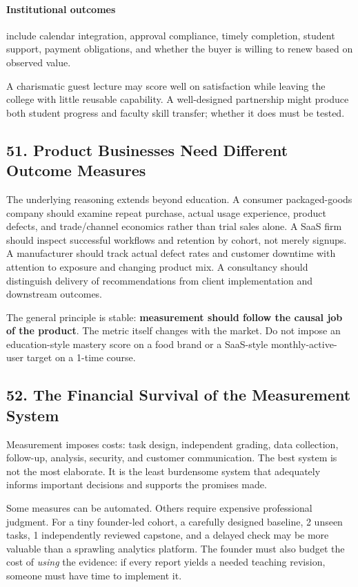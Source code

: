 \paragraph*{Institutional outcomes} include calendar integration, approval compliance, timely completion, student support, payment obligations, and whether the buyer is willing to renew based on observed value.

A charismatic guest lecture may score well on satisfaction while leaving the college with little reusable capability. A well-designed partnership might produce both student progress and faculty skill transfer; whether it does must be tested.

\subsection*{51. Product Businesses Need Different Outcome Measures}

The underlying reasoning extends beyond education. A consumer packaged-goods company should examine repeat purchase, actual usage experience, product defects, and trade/channel economics rather than trial sales alone. A SaaS firm should inspect successful workflows and retention by cohort, not merely signups. A manufacturer should track actual defect rates and customer downtime with attention to exposure and changing product mix. A consultancy should distinguish delivery of recommendations from client implementation and downstream outcomes.

The general principle is stable: \textbf{measurement should follow the causal job of the product}. The metric itself changes with the market. Do not impose an education-style mastery score on a food brand or a SaaS-style monthly-active-user target on a 1-time course.

\subsection*{52. The Financial Survival of the Measurement System}

Measurement imposes costs: task design, independent grading, data collection, follow-up, analysis, security, and customer communication. The best system is not the most elaborate. It is the least burdensome system that adequately informs important decisions and supports the promises made.

Some measures can be automated. Others require expensive professional judgment. For a tiny founder-led cohort, a carefully designed baseline, 2 unseen tasks, 1 independently reviewed capstone, and a delayed check may be more valuable than a sprawling analytics platform. The founder must also budget the cost of \emph{using} the evidence: if every report yields a needed teaching revision, someone must have time to implement it.
